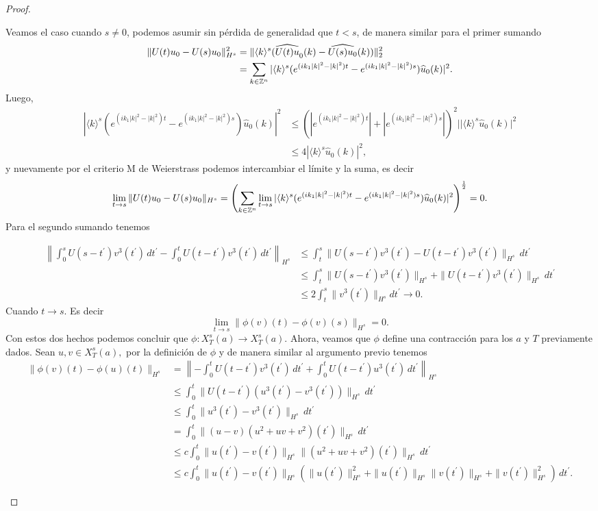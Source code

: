\begin{proof}
\begin{itemize}
       Veamos el caso cuando $s\neq 0$, podemos asumir sin pérdida de generalidad que $t<s$, de manera similar para el primer sumando
       \begin{align*}
           \|U(t)u_0-U(s)u_0\|_{H^s}^2&=\|\langle k\rangle^s(\widehat{U(t)u}_0(k)-\widehat{U(s)u_0}(k))\|_2^2\\
           &=\sum_{k\in\mathbb{Z}^n}|\langle k\rangle^s(e^{(ik_1|k|^2-|k|^2)t}-e^{(ik_1|k|^2-|k|^2)s})\widehat{u}_0(k)|^2.
       \end{align*}
       Luego,
       \begin{align*}
           |\langle k\rangle^s(e^{(ik_1|k|^2-|k|^2)t}-e^{(ik_1|k|^2-|k|^2)s})\hat{u}_0(k)|^2&\leq(|e^{(ik_1|k|^2-|k|^2)t}|+|e^{(ik_1|k|^2-|k|^2)s}|)^2||\langle k\rangle^s\hat{u}_0(k)|^2\\
           &\leq 4|\langle k\rangle^s\hat{u}_0(k)|^2,
       \end{align*}
       y nuevamente por el criterio M de Weierstrass podemos intercambiar el límite y la suma, es decir
       $$\lim_{t\to s}\|U(t)u_0-U(s)u_0\|_{H^s}=\left(\sum_{k\in\mathbb{Z}^n}\lim_{t\to s}|\langle k\rangle^s(e^{(ik_1|k|^2-|k|^2)t}-e^{(ik_1|k|^2-|k|^2)s})\widehat{u}_0(k)|^2\right)^{\frac{1}{2}}=0.$$
       Para el segundo sumando tenemos

       \begin{align*}
             \left\|\int_0^sU(s-t^\prime)v^3(t^\prime)\,dt^\prime-\int_0^tU(t-t^\prime)v^3(t^\prime)\,dt^\prime\right\|_{H^s}&\leq\int_t^s\|U(s-t^\prime)v^3(t^\prime)-U(t-t^\prime)v^3(t^\prime)\|_{H^s}\,dt^\prime\\
             &\leq\int_t^s\|U(s-t^\prime)v^3(t^\prime)\|_{H^s}+\|U(t-t^\prime)v^3(t^\prime)\|_{H^s}\,dt^\prime\\
             &\leq2\int_t^s\|v^3(t^\prime)\|_{H^s}dt^\prime\to 0.
         \end{align*} 
         Cuando $t\to s$. Es decir
         $$\lim_{t\to s}\|\phi(v)(t)-\phi(v)(s)\|_{H^s}=0.$$
       Con estos dos hechos podemos concluir que $\phi:X^s_T(a)\to X^s_T(a).$ Ahora, veamos que $\phi$ define una contracción para los $a$ y $T$  previamente dados. Sean $u,v\in X^s_T(a),$  por la definición de $\phi$ y de manera similar al argumento previo tenemos
       \begin{align*}
           \|\phi(v)(t)-\phi(u)(t)\|_{H^s}&=\left\|-\int_0^tU(t-t^\prime)v^3(t^\prime)\,dt^\prime+\int_0^tU(t-t^\prime)u^3(t^\prime)\,dt^\prime\right\|_{H^s}\\
           &\leq\int_0^t\|U(t-t^\prime)(u^3(t^\prime)-v^3(t^\prime))\|_{H^s}\,dt^\prime\\
           &\leq\int_0^t\|u^3(t^\prime)-v^3(t^\prime)\|_{H^s}\,dt^\prime\\
           &=\int_0^t\|(u-v)(u^2+uv+v^2)(t^\prime)\|_{H^s}\,dt^\prime\\
           &\leq c\int_0^t\|u(t^\prime)-v(t^\prime)\|_{H^s}\|(u^2+uv+v^2)(t^\prime)\|_{H^s}\,dt^\prime\\
           &\leq c\int_0^t\|u(t^\prime)-v(t^\prime)\|_{H^s}(\|u(t^\prime)\|^2_{H^s}+\|u(t^\prime)\|_{H^s}\|v(t^\prime)\|_{H^s}+\|v(t^\prime)\|^2_{H^s})\,dt^\prime.
       \end{align*}


\end{itemize}
\end{proof}
